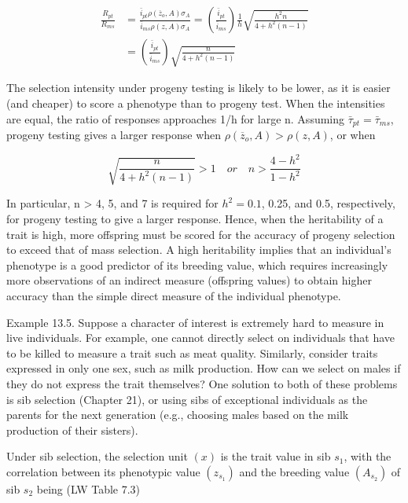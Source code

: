 \documentclass{article}
\begin{document}
\begin{equation}
\begin{aligned}\frac{R_{pt}}{R_{ms}}&=\frac{\bar{i}_{pt}\rho(\overline{z}_{o},A)\sigma_{A}}{\bar{i}_{ms}\rho(z,A)\sigma_{A}}=\left(\frac{\bar{i}_{pt}}{\bar{i}_{ms}}\right)\frac{1}{h}\sqrt{\frac{h^{2}n}{4+h^{2}(n-1)}}\\&=\left(\frac{\bar{i}_{pt}}{\bar{i}_{ms}}\right)\sqrt{\frac{n}{4+h^{2}(n-1)}}\end{aligned}
\end{equation}

The selection intensity under progeny testing is likely to be lower, as it is easier (and cheaper) to score a phenotype than to progeny test. When the intensities are equal, the ratio of responses approaches 1/h for large n. Assuming  $ \bar{\tau}_{pt} = \bar{\tau}_{ms} $, progeny testing gives a larger response when  $ \rho(\overline{z}_{o}, A) > \rho(z, A) $, or when

\begin{equation}
\sqrt{\frac{n}{4+h^{2}(n-1)}}>1\quad or\quad n>\frac{4-h^{2}}{1-h^{2}}
\end{equation}

In particular, n > 4, 5, and 7 is required for  $ h^2 = 0.1 $, 0.25, and 0.5, respectively, for progeny testing to give a larger response. Hence, when the heritability of a trait is high, more offspring must be scored for the accuracy of progeny selection to exceed that of mass selection. A high heritability implies that an individual's phenotype is a good predictor of its breeding value, which requires increasingly more observations of an indirect measure (offspring values) to obtain higher accuracy than the simple direct measure of the individual phenotype.

Example 13.5. Suppose a character of interest is extremely hard to measure in live individuals. For example, one cannot directly select on individuals that have to be killed to measure a trait such as meat quality. Similarly, consider traits expressed in only one sex, such as milk production. How can we select on males if they do not express the trait themselves? One solution to both of these problems is sib selection (Chapter 21), or using sibs of exceptional individuals as the parents for the next generation (e.g., choosing males based on the milk production of their sisters).

Under sib selection, the selection unit  $ (x) $ is the trait value in sib  $ s_1 $, with the correlation between its phenotypic value  $ (z_{s_1}) $ and the breeding value  $ (A_{s_2}) $ of sib  $ s_2 $ being (LW Table 7.3)
\end{document}
